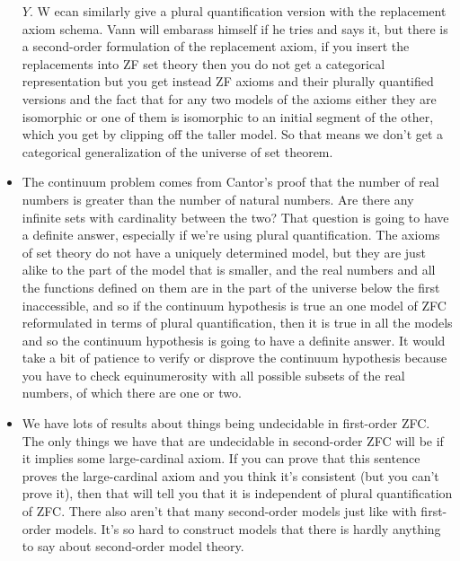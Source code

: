 \documentclass[12pt]{article}
\theoremstyle{definition}
\begin{document}
\begin{itemize}
        $Y$. W ecan similarly give a plural quantification version with the
        replacement axiom schema. Vann will embarass himself if he tries and
        says it, but there is a second-order formulation of the replacement
        axiom, if you insert the replacements into ZF set theory then you do
        not get a categorical representation but you get instead ZF axioms and
        their plurally quantified versions and the fact that for any two models
        of the axioms either they are isomorphic or one of them is isomorphic
        to an initial segment of the other, which you get by clipping off the
        taller model. So that means we don't get a categorical generalization
        of the universe of set theorem.
    \item
        The continuum problem comes from Cantor's proof that the number of real
        numbers is greater than the number of natural numbers. Are there any
        infinite sets with cardinality between the two? That question is going
        to have a definite answer, especially if we're using plural
        quantification. The axioms of set theory do not have a uniquely
        determined model, but they are just alike to the part of the model that
        is smaller, and the real numbers and all the functions defined on them
        are in the part of the universe below the first inaccessible, and so if
        the continuum hypothesis is true an one model of ZFC reformulated in
        terms of plural quantification, then it is true in all the models and
        so the continuum hypothesis is going to have a definite answer. It
        would take a bit of patience to verify or disprove the continuum
        hypothesis because you have to check equinumerosity with all possible
        subsets of the real numbers, of which there are one or two.
    \item
        We have lots of results about things being undecidable in first-order
        ZFC. The only things we have that are undecidable in second-order ZFC
        will be if it implies some large-cardinal axiom. If you can prove that
        this sentence proves the large-cardinal axiom and you think it's
        consistent (but you can't prove it), then that will tell you that it is
        independent of plural quantification of ZFC. There also aren't that
        many second-order models just like with first-order models. It's so
        hard to construct models that there is hardly anything to say about
        second-order model theory.
\end{itemize}
\end{document}
